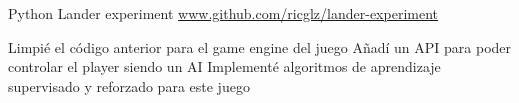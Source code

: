 \begin{cventries}
  \cventry
    {Python}
    {Lander experiment}
    {}
    {\url{www.github.com/ricglz/lander-experiment}}
    {
      \begin{cvitems}
         {{
          Limpié el código anterior para el game engine del juego
        }}
         {{
          Añadí un API para poder controlar el player siendo un AI
        }}
         {{
          Implementé algoritmos de aprendizaje supervisado y reforzado para este juego
        }}
      \end{cvitems}
    }


\end{cventries}
